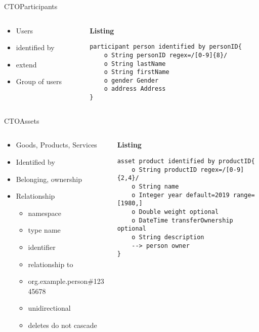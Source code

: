 \documentclass[pdf,table]{beamer}
\begin{document}
\begin{frame}[fragile]{CTO}{Participants}
	\begin{columns}[T]
		\begin{column}{0.48\textwidth}
			\begin{itemize}
				\item Users
				\item identified by
				\item extend
				\item Group of users 
			\end{itemize}	
		\end{column}
		\begin{column}{0.48\textwidth}
			{\bf Listing}
\begin{lstlisting}[language=CTO]
participant person identified by personID{
	o String personID regex=/[0-9]{8}/
	o String lastName
	o String firstName
	o gender Gender
	o address Address
}
			\end{lstlisting}
		\end{column}
	\end{columns}	
\end{frame}


\begin{frame}[fragile]{CTO}{Assets}
	\begin{columns}[T]
		\begin{column}{0.48\textwidth}
			\begin{itemize}
				\item Goods, Products, Services
				\item Identified by
				\item Belonging, ownership 
				\item Relationship 
					\begin{itemize}
						\item namespace
						\item type name
						\item identifier
						\item relationship to 
						\item org.example.person\#12345678
						\item unidirectional
						\item deletes do not cascade %
					\end{itemize}
			\end{itemize}	
		\end{column}
		\begin{column}{0.48\textwidth}
			{\bf Listing}
\begin{lstlisting}[language=CTO]
asset product identified by productID{
	o String productID regex=/[0-9]{2,4}/
	o String name 
	o Integer year default=2019 range=[1980,]
	o Double weight optional
	o DateTime transferOwnership optional
	o String description 
	--> person owner
}
			\end{lstlisting}
		\end{column}
	\end{columns}	
\end{frame}
\end{document}
